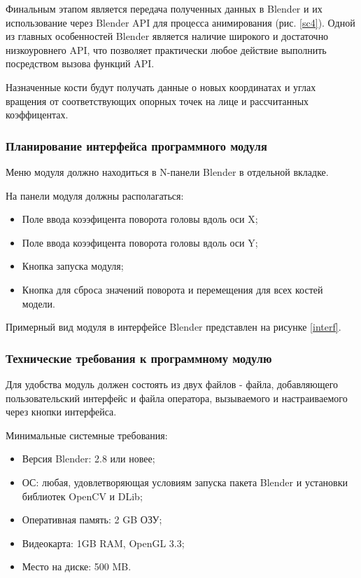 
Финальным этапом является передача полученных данных в Blender и их использование через Blender API для процесса анимирования (рис. \ref{sc4}). Одной из главных особенностей Blender является наличие широкого и достаточно низкоуровнего API, что позволяет практически любое действие выполнить посредством вызова функций API.

Назначенные кости будут получать данные о новых координатах и углах вращения от соответствующих опорных точек на лице и рассчитанных коэффицентах.

 
\subsubsection{Планирование интерфейса программного модуля}

Меню модуля должно находиться в N-панели Blender в отдельной вкладке.

На панели модуля должны располагаться:

\begin{itemize}
	\item Поле ввода коээфицента поворота головы вдоль оси X;
	\item Поле ввода коээфицента поворота головы вдоль оси Y;
	\item Кнопка запуска модуля;
	\item Кнопка для сброса значений поворота и перемещения для всех костей модели.
\end{itemize}

Примерный вид модуля в интерфейсе Blender представлен на рисунке \ref{interf}.



\subsubsection{Технические требования к программному модулю}

Для удобства модуль должен состоять из двух файлов - файла, добавляющего пользовательский интерфейс и файла оператора, вызываемого и настраиваемого через кнопки интерфейса.

Минимальные системные требования:
\begin{itemize}
	\item Версия Blender: 2.8 или новее;
	\item ОС: любая, удовлетворяющая условиям запуска пакета Blender и установки библиотек OpenCV и DLib;
	\item Оперативная память: 2 GB ОЗУ;
	\item Видеокарта: 1GB RAM, OpenGL 3.3;
	\item Место на диске: 500 MB.
\end{itemize}

\clearpage
